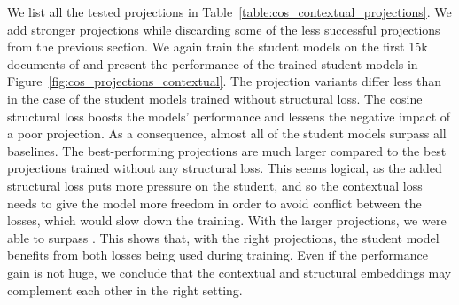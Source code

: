 We list all the tested projections in
Table~\ref{table:cos_contextual_projections}. We add stronger projections while
discarding some of the less successful projections from the previous section.
We again train the student models on the first 15k documents of
 and present the performance of the trained student models in
Figure~\ref{fig:cos_projections_contextual}. The projection variants differ
less than in the case of the student models trained without structural loss.
The cosine structural loss boosts the models' performance and lessens the
negative impact of a poor projection. As a consequence, almost all of the
student models surpass all baselines. The best-performing projections are much
larger compared to the best projections trained without any structural loss.
This seems logical, as the added structural loss puts more pressure on the
student, and so the contextual loss needs to give the model more freedom in
order to avoid conflict between the losses, which would slow down the training.
With the larger projections, we were able to surpass
. This shows that, with the right projections,
the student model benefits from both losses being used during training. Even if
the performance gain is not huge, we conclude that the contextual and
structural embeddings may complement each other in the right setting.

